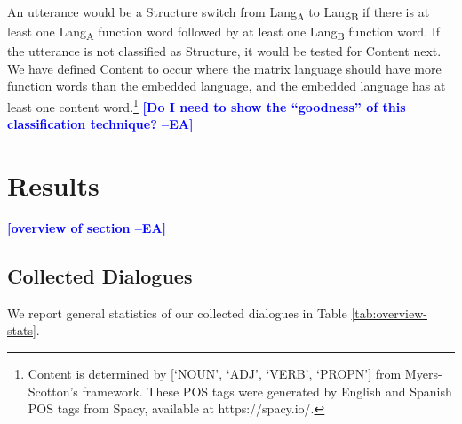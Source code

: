 \documentclass[11pt,a4paper]{article}
\newcommand{\ea}[1]{\textcolor{blue}{\bf\small [#1 --EA]}}
\begin{document}
An utterance would be a Structure switch from Lang\textsubscript{A} to Lang\textsubscript{B} if there is at least one Lang\textsubscript{A} function word followed by at least one Lang\textsubscript{B} function word.
If the utterance is not classified as Structure, it would be tested for Content next. 
We have defined Content to occur where the matrix language should have more function words than the embedded language, and the embedded language has at least one content word.\footnote{Content is determined by [`NOUN', `ADJ', `VERB', `PROPN'] from Myers-Scotton's framework. These POS tags were generated by English and Spanish POS tags from Spacy, available at https://spacy.io/.}
\ea{Do I need to show the ``goodness'' of this classification technique?}


\section{Results}
\label{sec:results}

\ea{overview of section}

\subsection{Collected Dialogues}
We report general statistics of our collected dialogues in Table \ref{tab:overview-stats}.
\end{document}
